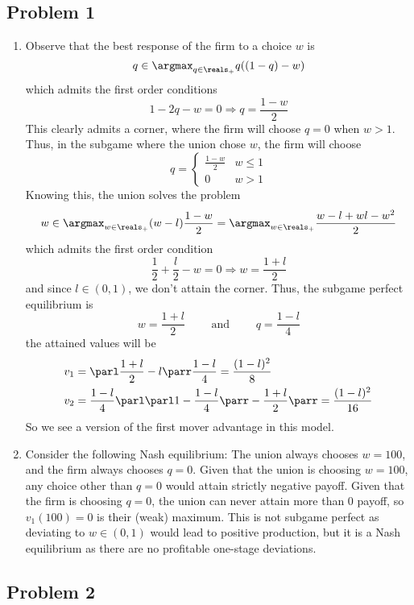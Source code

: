 \documentclass[10pt]{article}
\begin{document}
\maketitle

\subsection*{Problem 1}

\begin{enumerate}
	\item Observe that the best response of the firm to a choice $w$ is \[q \in \argmax_{q \in \reals_+} q((1-q)-w)\]which admits the first order conditions \[1 - 2q - w = 0 \Longrightarrow q = \frac{1-w}{2}\]This clearly admits a corner, where the firm will choose $q=0$ when $w > 1$. Thus, in the subgame where the union chose $w$, the firm will choose \[q = \begin{cases} \frac{1-w}{2} & w \le 1 \\0 & w > 1\end{cases}\]Knowing this, the union solves the problem \[w \in \argmax_{w \in \reals_+} (w-l)\frac{1-w}{2} = \argmax_{w \in \reals_+} \frac{w - l + wl - w^2}{2}\]which admits the first order condition\[\frac{1}{2} + \frac{l}{2} - w = 0 \Longrightarrow w = \frac{1+l}{2} \]and since $l \in (0,1)$, we don't attain the corner. Thus, the subgame perfect equilibrium is \[w = \frac{1+l}{2} \qquad \text{ and } \qquad q = \frac{1-l}{4}\]the attained values will be \begin{align*} v_1 &= \parl \frac{1+l}{2} - l\parr \frac{1-l}{4} = \frac{(1-l)^2}{8} \\ v_2 &= \frac{1-l}{4}\parl \parl 1 - \frac{1-l}{4}\parr - \frac{1+l}{2}\parr = \frac{(1-l)^2}{16}\end{align*}So we see a version of the first mover advantage in this model.
	\item Consider the following Nash equilibrium: The union always chooses $w = 100$, and the firm always chooses $q = 0$. Given that the union is choosing $w = 100$, any choice other than $q = 0$ would attain strictly negative payoff. Given that the firm is choosing $q = 0$, the union can never attain more than 0 payoff, so $v_1(100) = 0$ is their (weak) maximum. This is not subgame perfect as deviating to $w \in (0,1)$ would lead to positive production, but it is a Nash equilibrium as there are no profitable one-stage deviations.
\end{enumerate}

\subsection*{Problem 2}
\end{document}
